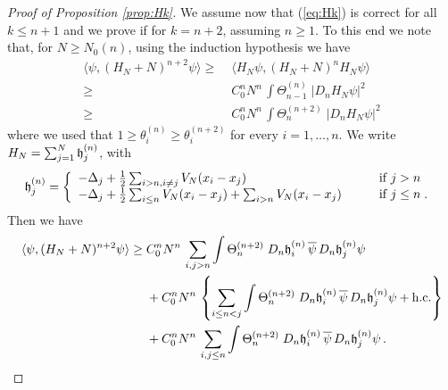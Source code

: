 \documentclass[11pt]{article}
\newcommand{\fh}{{\frak h}}
\begin{document}
\begin{proof}[Proof of Proposition \ref{prop:Hk}]
We assume now that (\ref{eq:Hk}) is correct for all $k\leq n+1$ and
we prove if for $k=n+2$, assuming $n\geq 1$. To this end we note
that, for $N \geq N_0 (n)$, using the induction hypothesis we have
\begin{equation}
\begin{split}
\langle \psi, (H_N +N)^{n+2} \psi \rangle \geq \; & \langle H_N
\psi,
(H_N+N)^n H_N \psi \rangle \\
\geq \; & C_0^n N^n \, \int \Theta^{(n)}_{n-1} \; |D_n H_N \psi|^2
\\ \geq \; & C_0^n N^n
\, \int \Theta^{(n+2)}_n \; |D_n H_N \psi|^2
\end{split}
\end{equation}
where we used that $1 \geq \theta^{(n)}_i \geq \theta^{(n+2)}_i$ for
every $i=1,\dots,n$. We write $H_N = \sum_{j=1}^N \fh^{(n)}_j$, with
\begin{equation}\label{eq:frakhn}
\fh_j^{(n)} = \left\{
\begin{array}{ll}
-\Delta_j + \frac{1}{2} \sum_{i > n, i\neq j} V_N (x_i
-x_j) \qquad &\text{if } j > n \\
-\Delta_j + \frac{1}{2} \sum_{i \leq n} V_N (x_i -x_j) + \sum_{i >
n} V_N (x_i -x_j) \qquad &\text{if } j \leq n\; .
\end{array}\right. \;
\end{equation}
Then we have
\begin{equation}
\begin{split}
\langle \psi, (H_N+N)^{n+2} \psi \rangle \geq \; & C_0^n N^n \,
\sum_{i,j > n} \int \Theta^{(n+2)}_n \; D_n \fh^{(n)}_i \,
\overline{\psi} \, D_n \fh^{(n)}_j \psi
\\ &+ C_0^n N^n \, \left\{ \sum_{i\leq n < j} \int \Theta^{(n+2)}_n
\; D_n \fh^{(n)}_i \, \overline{\psi} \, D_n \fh^{(n)}_j \psi +
\text{h.c.} \right\} \\ &+ C_0^n N^n \, \sum_{i,j \leq n} \int
\Theta^{(n+2)}_n \; D_n \fh^{(n)}_i \, \overline{\psi} \, D_n
\fh^{(n)}_j \psi \, .
\end{split}
\end{equation}


\end{proof}
\end{document}
